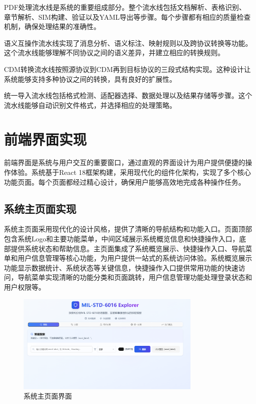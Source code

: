 PDF处理流水线是系统的重要组成部分。整个流水线包括文档解析、表格识别、章节解析、SIM构建、验证以及YAML导出等步骤。每个步骤都有相应的质量检查机制，确保处理结果的准确性。

语义互操作流水线实现了消息分析、语义标注、映射规则以及跨协议转换等功能。这个流水线能够理解不同协议之间的语义差异，并建立相应的转换规则。

CDM转换流水线按照源协议到CDM再到目标协议的三段式结构实现。这种设计让系统能够支持多种协议之间的转换，具有良好的扩展性。

统一导入流水线包括格式检测、适配器选择、数据处理以及结果存储等步骤。这个流水线能够自动识别文件格式，并选择相应的处理策略。


\section{前端界面实现}

前端界面是系统与用户交互的重要窗口，通过直观的界面设计为用户提供便捷的操作体验。系统基于React 18框架构建，采用现代化的组件化架构，实现了多个核心功能页面。每个页面都经过精心设计，确保用户能够高效地完成各种操作任务。

\subsection{系统主页面实现}

系统主页面采用现代化的设计风格，提供了清晰的导航结构和功能入口。页面顶部包含系统Logo和主要功能菜单，中间区域展示系统概览信息和快捷操作入口，底部提供系统状态和帮助信息。主页面集成了系统概览展示、快捷操作入口、导航菜单和用户信息管理等核心功能，为用户提供一站式的系统访问体验。系统概览展示功能显示数据统计、系统状态等关键信息，快捷操作入口提供常用功能的快速访问，导航菜单实现清晰的功能分类和页面跳转，用户信息管理功能处理登录状态和用户权限等。

\begin{figure}[H]
\centering
\includegraphics[width=0.8\textwidth]{chapters/fig-0/front-homepage.png}
\caption{系统主页面界面}
\label{fig:frontend-homepage}
\end{figure}

